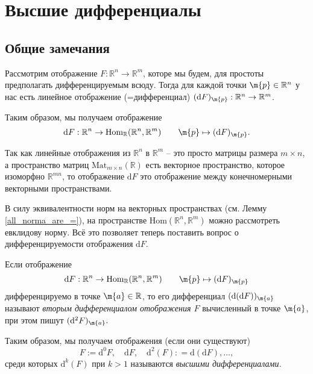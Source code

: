 





\section{Высшие дифференциалы}

\subsection{Общие замечания}

Рассмотрим отображение $F: \mathbb{R}^n \to \mathbb{R}^m$, которе мы будем, для простоты предполагать дифференцируемым всюду. Тогда для каждой точки $\m{p} \in \mathbb{R}^n$ у нас есть линейное отображение (=дифференциал) $(\mathrm{d}F)_{\m{p}}: \mathbb{R}^n\to \mathbb{R}^m$. 

Таким образом, мы получаем отображение
\[
 \mathrm{d}F: \mathbb{R}^n\to \mathrm{Hom}_\mathbb{R}(\mathbb{R}^n, \mathbb{R}^m) \qquad \m{p} \mapsto (\mathrm{d}F)_{\m{p}}.
\]

Так как линейные отображения из $\mathbb{R}^n$ в $\mathbb{R}^m$ -- это просто матрицы размера $m\times n$, а пространство матриц $\mathrm{Mat}_{m\times n}(\mathbb{R})$ есть векторное пространство, которое изоморфно $\mathbb{R}^{mn}$, то отображение $\mathrm{d}F$ это отображение между конечномерными векторными пространствами.

В силу эквивалентности норм на векторных пространствах (см. Лемму \ref{all_norma_are_=}), на пространстве $\mathrm{Hom}(\mathbb{R}^n, \mathbb{R}^m)$ можно рассмотреть евклидову норму. Всё это позволяет теперь поставить вопрос о дифференцируемости отображения $\mathrm{d}F$.

\begin{definition}
Если отображение
\[
 \mathrm{d}F: \mathbb{R}^n\to \mathrm{Hom}_\mathbb{R}(\mathbb{R}^n, \mathbb{R}^m) \qquad \m{p} \mapsto (\mathrm{d}F)_{\m{p}}
\]
дифференцируемо в точке $\m{a} \in \mathbb{R}$, то его дифференциал $(\mathrm{d}(\mathrm{d}F))_\m{a}$ называют \textit{вторым дифференциалом отображения $F$} вычисленный в точке $\m{a}$, при этом пишут $(\mathrm{d}^2F)_\m{a}.$ 

Таким образом, мы получаем отображения (если они существуют)
\[
 F:=\mathrm{d}^0F,\quad  \mathrm{d}F,\quad \mathrm{d}^2(F): = \mathrm{d}(\mathrm{d}F), \ldots, 
\]
среди которых $\mathrm{d}^k(F)$ при $k>1$ называются \textit{высшими дифференциалами.}
\end{definition}

